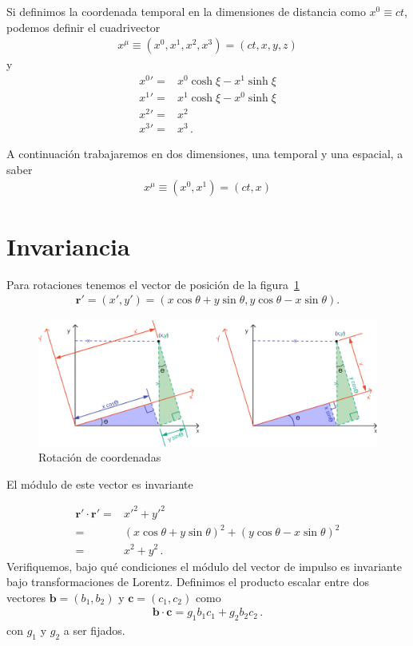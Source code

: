 \documentclass[11pt,a4paper]{article}
\begin{document}
Si definimos la coordenada temporal en la dimensiones de distancia como $x^0\equiv ct$, podemos definir el cuadrivector
\begin{align}
    x^\mu \equiv \left(x^0, x^1, x^2,x^3 \right) = \left(ct, x, y,z \right)
\end{align}
y
\[
\boxed{
\begin{aligned}    
    {x^0}' =& x^0\cosh\xi - x^1\sinh\xi \\
    {x^1}' = &x^1\cosh\xi -x^0\sinh\xi\\
    {x^2}' = & x^2\\
    {x^3}' = &x^3\,.
\end{aligned}
}
\]

A continuación trabajaremos en dos dimensiones, una temporal y una espacial, a saber
\begin{align}
    x^\mu \equiv \left(x^0, x^1 \right) = \left(ct, x \right)
\end{align}

\section{Invariancia}
Para rotaciones tenemos el vector de posición de la figura~\ref{fig:rot}
\begin{align*}
    \boldsymbol{r}' = (x',y')=  (x\cos\theta+y\sin\theta,y\cos\theta-x\sin\theta).
\end{align*}

\begin{figure}
    \centering
    \includegraphics[width=1\linewidth]{so2}
    \caption{Rotación de coordenadas}
    \label{fig:rot}
\end{figure}

El módulo de este vector es invariante

\begin{align*}
    \boldsymbol{r}'\cdot\boldsymbol{r}' =&{x'}^2+{y'}^2  \\
    =&(x\cos\theta+y\sin\theta)^2+(y\cos\theta-x\sin\theta)^2\\
    = & x^2+y^2\,.
\end{align*}
Verifiquemos, bajo qué condiciones el módulo del vector de impulso es invariante bajo transformaciones de Lorentz. Definimos el producto escalar entre dos vectores
$\boldsymbol{b} = (b_1,b_2)$ y $\boldsymbol{c} = (c_1,c_2) $ como
\begin{align}
    \boldsymbol{b} \cdot \boldsymbol{c} = g_{1} b_1 c_1 + g_{2} b_2 c_2\,.
\end{align}
con $g_{1}$ y $g_{2}$ a ser fijados. 
\end{document}
